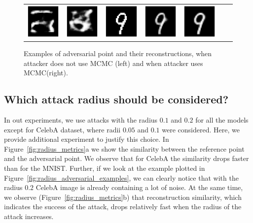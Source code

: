 \begin{figure}[h]
\begin{tabular}{cccc|ccc}
         \includegraphics[width=0.1\linewidth]{pics/3_adv_att/mnist_MCMC/mnist_noMCMC_adv_rec_3_rad_1.0.pdf} & 
          \includegraphics[width=0.1\linewidth]{pics/3_adv_att/mnist_MCMC/mnist_noMCMC_adv_rec_t_3_rad_1.0.pdf} &
           \includegraphics[width=0.1\linewidth]{pics/3_adv_att/mnist_MCMC/mnist_MCMC_adv_3_rad_1.0.pdf} &
           \includegraphics[width=0.1\linewidth]{pics/3_adv_att/mnist_MCMC/mnist_MCMC_adv_rec_3_rad_1.0.pdf} &
           \includegraphics[width=0.1\linewidth]{pics/3_adv_att/mnist_MCMC/mnist_MCMC_adv_rec_t_3_rad_1.0.pdf} \\
    \end{tabular}
    \caption{Examples of adversarial point and their reconstructions, when attacker does not use MCMC (left) and when attacker uses MCMC(right).}
    \label{fig:mcmc_attack_example}
        \vspace*{2\baselineskip}
\end{figure}


\newpage



\subsection{Which attack radius should be considered?}\label{appendix:attack_radius}

In out experiments, we use attacks with the radius $0.1$ and $0.2$ for all the models except for CelebA dataset, where radii $0.05$ and $0.1$ were considered. Here, we provide additional experiment to justify this choice. In Figure~\ref{fig:radius_metrics}a we show the similarity between the reference point and the adversarial point. We observe that for CelebA the similarity drops faster than for the MNIST. Further, if we look at the example plotted in Figure~\ref{fig:radius_adversarial_examples}, we can clearly notice that with the radius $0.2$ CelebA image is already containing a lot of noise. At the same time, we observe (Figure~\ref{fig:radius_metrics}b) that reconstruction similarity, which indicates the success of the attack, drops relatively fast when the radius of the attack increases. 

